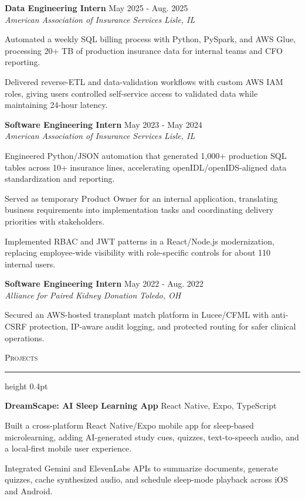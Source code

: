 \documentclass[letterpaper,11pt]{article}
\newcommand{\resumesection}[1]{%
  \par\vspace{2pt}%
  {\large\scshape #1}\par\vspace{2pt}%
  \hrule height 0.4pt\vspace{2pt}%
}
\newcommand{\resumeSubheading}[4]{
  \textbf{#1} \hfill #2\\
  \textit{#3} \hfill \textit{#4}
}
\newcommand{\projectHeading}[2]{
  \textbf{#1} \hfill #2
}
\begin{document}
\resumeSubheading
{Data Engineering Intern}{May 2025 - Aug. 2025}
{American Association of Insurance Services}{Lisle, IL}
\begin{tightitemize}
  \item Automated a weekly SQL billing process with Python, PySpark, and AWS Glue, processing 20+ TB of production insurance data for internal teams and CFO reporting.
  \item Delivered reverse-ETL and data-validation workflows with custom AWS IAM roles, giving users controlled self-service access to validated data while maintaining 24-hour latency.
\end{tightitemize}

\resumeSubheading
{Software Engineering Intern}{May 2023 - May 2024}
{American Association of Insurance Services}{Lisle, IL}
\begin{tightitemize}
  \item Engineered Python/JSON automation that generated 1,000+ production SQL tables across 10+ insurance lines, accelerating openIDL/openIDS-aligned data standardization and reporting.
  \item Served as temporary Product Owner for an internal application, translating business requirements into implementation tasks and coordinating delivery priorities with stakeholders.
  \item Implemented RBAC and JWT patterns in a React/Node.js modernization, replacing employee-wide visibility with role-specific controls for about 110 internal users.
\end{tightitemize}

\resumeSubheading
{Software Engineering Intern}{May 2022 - Aug. 2022}
{Alliance for Paired Kidney Donation}{Toledo, OH}
\begin{tightitemize}
  \item Secured an AWS-hosted transplant match platform in Lucee/CFML with anti-CSRF protection, IP-aware audit logging, and protected routing for safer clinical operations.
\end{tightitemize}

\resumesection{Projects}
\projectHeading{DreamScape: AI Sleep Learning App}{React Native, Expo, TypeScript}
\begin{tightitemize}
  \item Built a cross-platform React Native/Expo mobile app for sleep-based microlearning, adding AI-generated study cues, quizzes, text-to-speech audio, and a local-first mobile user experience.
  \item Integrated Gemini and ElevenLabs APIs to summarize documents, generate quizzes, cache synthesized audio, and schedule sleep-mode playback across iOS and Android.
\end{tightitemize}
\end{document}
